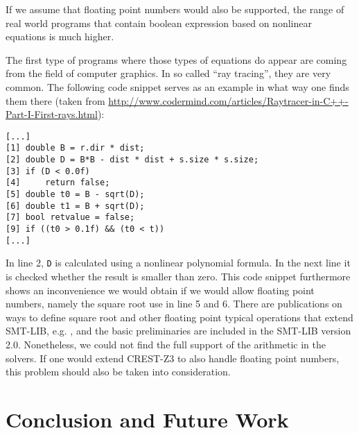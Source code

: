 \documentclass[oribibl]{llncs}
\begin{document}
If we assume that floating point numbers would also be supported, the
range of real world programs that contain boolean expression based on
nonlinear equations is much higher.

The first type of programs where those types of equations do appear
are coming from the field of computer graphics. In so called ``ray
tracing'', they are very common. The following code snippet serves as an example in what way one finds them there (taken from \url{http://www.codermind.com/articles/Raytracer-in-C++-Part-I-First-rays.html}):
\begin{verbatim}
[...]
[1] double B = r.dir * dist;
[2] double D = B*B - dist * dist + s.size * s.size; 
[3] if (D < 0.0f) 
[4]     return false; 
[5] double t0 = B - sqrt(D); 
[6] double t1 = B + sqrt(D);
[7] bool retvalue = false;  
[9] if ((t0 > 0.1f) && (t0 < t)) 
[...]
\end{verbatim}

In line 2, \texttt{D} is calculated using a nonlinear polynomial
formula. In the next line it is checked whether the result is smaller
than zero.
This code snippet furthermore shows an inconvenience we would obtain
if we would allow floating point numbers, namely the square root use
in line 5 and 6. There are publications on ways to define square root and other
floating point typical operations that extend \textsc{SMT-LIB},
e.g. \cite{rummer2010smt}, and the basic preliminaries are included in
the \textsc{SMT-LIB} version 2.0. Nonetheless, we could not find the
full support of the arithmetic in the solvers. If one would extend
\textsc{CREST-Z3} to also handle floating point numbers, this problem
should also be taken into consideration.




\section{Conclusion and Future Work}
\label{sctn:Conclusion}




\end{document}
